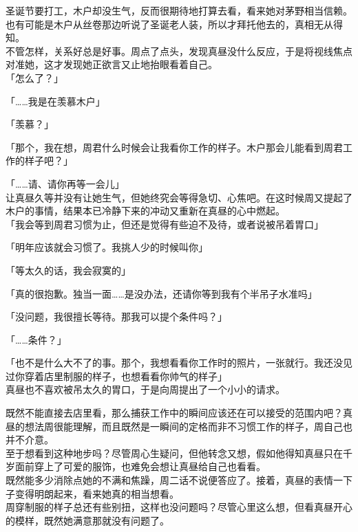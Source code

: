 圣诞节要打工，木户却没生气，反而很期待地打算去看，看来她对茅野相当信赖。也有可能是木户从丝卷那边听说了圣诞老人装，所以才拜托他去的，真相无从得知。\\

不管怎样，关系好总是好事。周点了点头，发现真昼没什么反应，于是将视线焦点对准她，这才发现她正欲言又止地抬眼看着自己。\\

「怎么了？」

「……我是在羡慕木户」

「羡慕？」

「那个，我在想，周君什么时候会让我看你工作的样子。木户那会儿能看到周君工作的样子吧？」

「……请、请你再等一会儿」\\

让真昼久等并没有让她生气，但她终究会等得急切、心焦吧。在这时候周又提起了木户的事情，结果本已冷静下来的冲动又重新在真昼的心中燃起。\\

「我会等到周君习惯为止，但还是觉得有些迫不及待，或者说被吊着胃口」

「明年应该就会习惯了。我挑人少的时候叫你」

「等太久的话，我会寂寞的」

「真的很抱歉。独当一面……是没办法，还请你等到我有个半吊子水准吗」

「没问题，我很擅长等待。那我可以提个条件吗？」

「……条件？」

「也不是什么大不了的事。那个，我想看看你工作时的照片，一张就行。我还没见过你穿着店里制服的样子，也想看看你帅气的样子」\\

真昼也不喜欢被吊太久的胃口，于是向周提出了一个小小的请求。

既然不能直接去店里看，那么捕获工作中的瞬间应该还在可以接受的范围内吧？真昼的想法周很能理解，而且既然是一瞬间的定格而非不习惯工作的样子，周自己也并不介意。\\

至于想看到这种地步吗？尽管周心生疑问，但他转念又想，假如他得知真昼只在千岁面前穿上了可爱的服饰，也难免会想让真昼给自己也看看。\\

既然能多少消除点她的不满和焦躁，周二话不说便答应了。接着，真昼的表情一下子变得明朗起来，看来她真的相当想看。\\

周穿制服的样子总还有些别扭，这样也没问题吗？尽管心里这么想，但看真昼开心的模样，既然她满意那就没有问题了。\\


